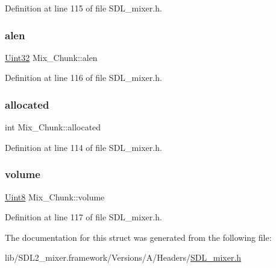 Definition at line 115 of file S\+D\+L\+\_\+mixer.\+h.

\mbox{\label{struct_mix___chunk_a958507964471fc4b9fa0d215f1852d05}} 
\subsubsection{\texorpdfstring{alen}{alen}}
{\footnotesize\ttfamily \mbox{\hyperlink{_s_d_l__stdinc_8h_add440eff171ea5f55cb00c4a9ab8672d}{Uint32}} Mix\+\_\+\+Chunk\+::alen}



Definition at line 116 of file S\+D\+L\+\_\+mixer.\+h.

\mbox{\label{struct_mix___chunk_a7b985b90b5f97fffe34834116a281615}} 
\subsubsection{\texorpdfstring{allocated}{allocated}}
{\footnotesize\ttfamily int Mix\+\_\+\+Chunk\+::allocated}



Definition at line 114 of file S\+D\+L\+\_\+mixer.\+h.

\mbox{\label{struct_mix___chunk_afc566fd5da7f0ed1f3577f5bc0eac319}} 
\subsubsection{\texorpdfstring{volume}{volume}}
{\footnotesize\ttfamily \mbox{\hyperlink{_s_d_l__stdinc_8h_a2944638813a090aa23e62f4da842c3e2}{Uint8}} Mix\+\_\+\+Chunk\+::volume}



Definition at line 117 of file S\+D\+L\+\_\+mixer.\+h.



The documentation for this struct was generated from the following file\+:\begin{DoxyCompactItemize}
\item 
lib/\+S\+D\+L2\+\_\+mixer.\+framework/\+Versions/\+A/\+Headers/\mbox{\hyperlink{_s_d_l__mixer_8h}{S\+D\+L\+\_\+mixer.\+h}}\end{DoxyCompactItemize}
